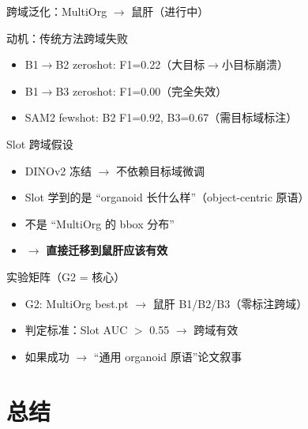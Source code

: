 \documentclass[aspectratio=169, 10pt]{beamer}
\begin{document}
\begin{frame}{跨域泛化：MultiOrg $\to$ 鼠肝（进行中）}
  \begin{block}{动机：传统方法跨域失败}
    \begin{itemize}
      \item B1$\to$B2 zeroshot: F1=0.22（大目标$\to$小目标崩溃）
      \item B1$\to$B3 zeroshot: F1=0.00（完全失效）
      \item SAM2 fewshot: B2 F1=0.92, B3=0.67（需目标域标注）
    \end{itemize}
  \end{block}
  \vspace{0em}
  \begin{alertblock}{Slot 跨域假设}
    \begin{itemize}
      \item DINOv2 冻结 $\to$ 不依赖目标域微调
      \item Slot 学到的是 ``organoid 长什么样''（object-centric 原语）
      \item 不是 ``MultiOrg 的 bbox 分布''
      \item $\to$ \textbf{直接迁移到鼠肝应该有效}
    \end{itemize}
  \end{alertblock}
  \vspace{0em}
  \begin{block}{实验矩阵（G2 = 核心）}
    \begin{itemize}
      \item G2: MultiOrg best.pt $\to$ 鼠肝 B1/B2/B3（零标注跨域）
      \item 判定标准：Slot AUC $>$ 0.55 $\to$ 跨域有效
      \item 如果成功 $\to$ ``通用 organoid 原语''论文叙事
    \end{itemize}
  \end{block}
\end{frame}


\section{总结}
\end{document}
